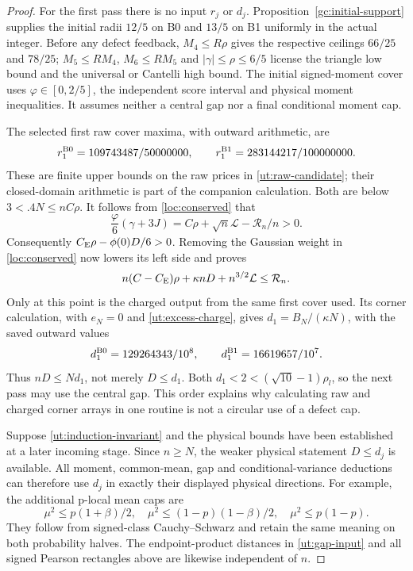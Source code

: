 \begin{proof}
For the first pass there is no input $r_j$ or $d_j$.
Proposition~\ref{gc:initial-support} supplies the initial radii
$12/5$ on B0 and $13/5$ on B1 uniformly in the actual integer.
Before any defect feedback,
$M_4\le R\rho$ gives the respective ceilings $66/25$ and $78/25$;
$M_5\le RM_4$, $M_6\le RM_5$ and $|\gamma|\le\rho\le6/5$
license the triangle low bound and the universal or Cantelli high
bound. The initial signed-moment cover uses $\varphi\in[0,2/5]$,
the independent score interval and physical moment inequalities.
It assumes neither a central gap nor a final conditional moment cap.

The selected first raw cover maxima, with outward arithmetic, are
\[
 r_1^{\rm B0}=109743487/50000000,
 \qquad r_1^{\rm B1}=283144217/100000000.
\]
These are finite upper bounds on the raw prices in
\eqref{ut:raw-candidate}; their closed-domain arithmetic is part of
the companion calculation. Both are below $3<.4N\le nC\rho$.
It follows from \eqref{loc:conserved} that
\[
 \frac{\varphi}{6}(\gamma+3J)
            =C\rho+\sqrt n\mathcal L-\mathcal R_n/n>0.
\]
Consequently $C_{\mathrm E}\rho-\phi(0)D/6>0$. Removing the Gaussian weight
in \eqref{loc:conserved} now lowers its left side and proves
\begin{equation}\label{ut:bootstrap}
 n(C-C_{\mathrm E})\rho+\kappa nD+n^{3/2}\mathcal L\le\mathcal R_n.
\end{equation}
Only at this point is the charged output from the same first cover
used. Its corner calculation, with $e_N=0$ and
\eqref{ut:excess-charge}, gives
$d_1=B_N/(\kappa N)$, with the saved outward values
\[
 d_1^{\rm B0}=129264343/10^8,\qquad
 d_1^{\rm B1}=16619657/10^7.
\]
Thus $nD\le Nd_1$, not merely $D\le d_1$.
Both $d_1<2< (\sqrt{10}-1)\rho_l$, so the next pass may use the
central gap. This order explains why calculating raw and charged
corner arrays in one routine is not a circular use of a defect cap.

Suppose \eqref{ut:induction-invariant} and the physical bounds have
been established at a later incoming stage. Since $n\ge N$, the
weaker physical statement $D\le d_j$ is available. All moment,
common-mean, gap and conditional-variance deductions can therefore
use $d_j$ in exactly their displayed physical directions.
For example, the additional p-local mean caps are
\[
 \mu^2\le p(1+\beta)/2,\quad
 \mu^2\le(1-p)(1-\beta)/2,\quad \mu^2\le p(1-p).
\]
They follow from signed-class Cauchy--Schwarz and retain the same
meaning on both probability halves. The endpoint-product distances
in \eqref{ut:gap-input} and all signed Pearson rectangles above
are likewise independent of $n$.


\end{proof}
